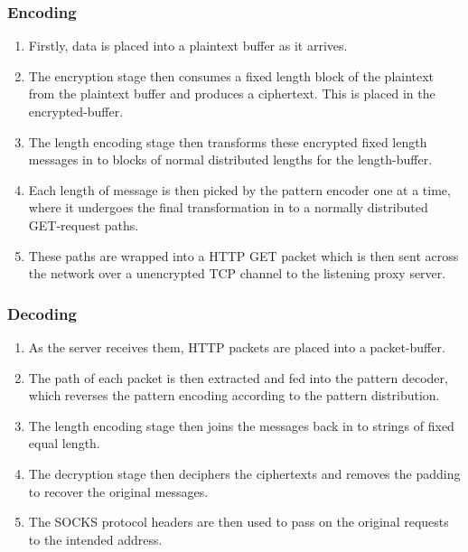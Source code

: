 \documentclass[ %
                    author={Samuel Russell},
                supervisor={Prof. Bogdan Warinschi},
                    degree={MEng},
                     title={Innocuous Ciphertexts},
                  subtitle={The DE-CENSOR Scheme},
                      type={research},
                      year={2018} ]{dissertation}
\begin{document}
\subsubsection{Encoding}

\begin{enumerate}
\item Firstly, data is placed into a plaintext buffer as it arrives.

\item The encryption stage then consumes a fixed length block of the plaintext from the plaintext buffer and produces a ciphertext.
This is placed in the encrypted-buffer.

\item The length encoding stage then transforms these encrypted fixed length messages in to blocks of normal distributed lengths for the length-buffer.

\item Each length of message is then picked by the pattern encoder one at a time, where it undergoes the final transformation in to a normally distributed GET-request paths. 

\item These paths are wrapped into a HTTP GET packet which is then sent across the network over a unencrypted TCP channel to the listening proxy server.
\end{enumerate}

\subsubsection{Decoding}

\begin{enumerate}
\item As the server receives them, HTTP packets are placed into a packet-buffer.

\item The path of each packet is then extracted and fed into the pattern decoder, which reverses the pattern encoding according to the pattern distribution.

\item The length encoding stage then joins the messages back in to strings of fixed equal length.

\item The decryption stage then deciphers the ciphertexts and removes the padding to recover the original messages.

\item The SOCKS protocol headers are then used to pass on the original requests to the intended address.

\end{enumerate}
\end{document}
